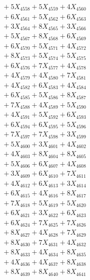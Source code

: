 \documentclass[a4paper,10pt]{article}
\begin{document}
{\begin{align}
&\;  + 5 X_{4558} + 5 X_{4559} + 4 X_{4560} \\[0.3ex]
&\;  + 6 X_{4561} + 5 X_{4562} + 6 X_{4563} \\[0.3ex]
&\;  + 3 X_{4564} + 8 X_{4565} + 3 X_{4566} \\[0.3ex]
&\;  + 5 X_{4567} + 8 X_{4568} + 6 X_{4569} \\[0.5ex]\allowbreak
&\;  + 6 X_{4570} + 5 X_{4571} + 4 X_{4572} \\[0.3ex]
&\;  + 8 X_{4573} + 5 X_{4574} + 5 X_{4575} \\[0.3ex]
&\;  + 6 X_{4576} + 7 X_{4577} + 4 X_{4578} \\[0.3ex]
&\;  + 4 X_{4579} + 4 X_{4580} + 7 X_{4581} \\[0.3ex]
&\;  + 4 X_{4582} + 6 X_{4583} + 4 X_{4584} \\[0.3ex]
&\;  + 6 X_{4585} + 5 X_{4586} + 8 X_{4587} \\[0.3ex]
&\;  + 7 X_{4588} + 4 X_{4589} + 5 X_{4590} \\[0.3ex]
&\;  + 4 X_{4591} + 5 X_{4592} + 6 X_{4593} \\[0.3ex]
&\;  + 6 X_{4594} + 6 X_{4595} + 5 X_{4596} \\[0.3ex]
&\;  + 7 X_{4597} + 7 X_{4598} + 3 X_{4599} \\[0.5ex]\allowbreak
&\;  + 5 X_{4600} + 3 X_{4601} + 4 X_{4602} \\[0.3ex]
&\;  + 4 X_{4603} + 8 X_{4604} + 8 X_{4605} \\[0.3ex]
&\;  + 5 X_{4606} + 6 X_{4607} + 4 X_{4608} \\[0.3ex]
&\;  + 3 X_{4609} + 6 X_{4610} + 7 X_{4611} \\[0.3ex]
&\;  + 4 X_{4612} + 6 X_{4613} + 3 X_{4614} \\[0.3ex]
&\;  + 6 X_{4615} + 4 X_{4616} + 8 X_{4617} \\[0.3ex]
&\;  + 7 X_{4618} + 5 X_{4619} + 5 X_{4620} \\[0.3ex]
&\;  + 6 X_{4621} + 3 X_{4622} + 6 X_{4623} \\[0.3ex]
&\;  + 6 X_{4624} + 7 X_{4625} + 7 X_{4626} \\[0.3ex]
&\;  + 8 X_{4627} + 4 X_{4628} + 7 X_{4629} \\[0.5ex]\allowbreak
&\;  + 8 X_{4630} + 7 X_{4631} + 4 X_{4632} \\[0.3ex]
&\;  + 8 X_{4633} + 4 X_{4634} + 8 X_{4635} \\[0.3ex]
&\;  + 4 X_{4636} + 4 X_{4637} + 8 X_{4638} \\[0.3ex]
&\;  + 8 X_{4639} + 8 X_{4640} + 8 X_{4641} \\[0.3ex]

\end{align}}
\end{document}
